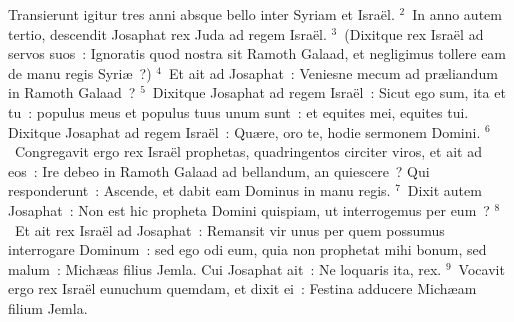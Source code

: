 \bchapter
\lettrine[lines=3,image=true,loversize=0.05,lraise=-0.03]{T}{}ransierunt igitur tres anni absque bello inter Syriam et Isra\"el.
${}^{2}$~In anno autem tertio, descendit Josaphat rex Juda ad regem Isra\"el.
${}^{3}$~(Dixitque rex Isra\"el ad servos suos~: Ignoratis quod nostra sit Ramoth Galaad, et negligimus tollere eam de manu regis Syri\ae~?)
${}^{4}$~Et ait ad Josaphat~: Veniesne mecum ad pr\ae liandum in Ramoth Galaad~?
${}^{5}$~Dixitque Josaphat ad regem Isra\"el~: Sicut ego sum, ita et tu~: populus meus et populus tuus unum sunt~: et equites mei, equites tui. Dixitque Josaphat ad regem Isra\"el~: Qu\ae re, oro te, hodie sermonem Domini.
${}^{6}$~Congregavit ergo rex Isra\"el prophetas, quadringentos circiter viros, et ait ad eos~: Ire debeo in Ramoth Galaad ad bellandum, an quiescere~? Qui responderunt~: Ascende, et dabit eam Dominus in manu regis.
${}^{7}$~Dixit autem Josaphat~: Non est hic propheta Domini quispiam, ut interrogemus per eum~?
${}^{8}$~Et ait rex Isra\"el ad Josaphat~: Remansit vir unus per quem possumus interrogare Dominum~: sed ego odi eum, quia non prophetat mihi bonum, sed malum~: Mich\ae as filius Jemla. Cui Josaphat ait~: Ne loquaris ita, rex.
${}^{9}$~Vocavit ergo rex Isra\"el eunuchum quemdam, et dixit ei~: Festina adducere Mich\ae am filium Jemla.


